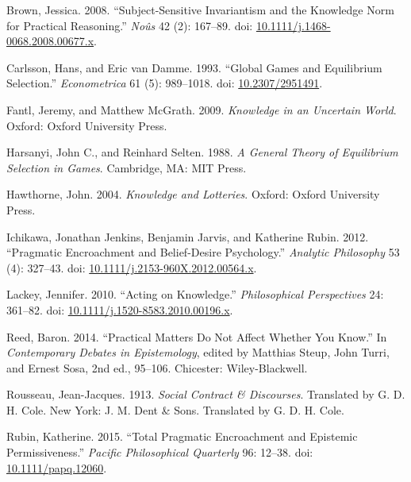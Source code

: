 \documentclass[
  11pt,
  letterpaper,
  DIV=11,
  numbers=noendperiod,
  twoside]{scrartcl}
\newlength{\cslhangindent}
\newenvironment{CSLReferences}[2] %
 {\begin{list}{}{%
  \setlength{\itemindent}{0pt}
  \setlength{\leftmargin}{0pt}
  \setlength{\parsep}{0pt}
  \ifodd #1
   \setlength{\leftmargin}{\cslhangindent}
   \setlength{\itemindent}{-1\cslhangindent}
  \fi
  \setlength{\itemsep}{#2\baselineskip}}}
 {\end{list}}
\begin{document}
\label{refs}
\begin{CSLReferences}{1}{0}
Brown, Jessica. 2008. {``Subject-Sensitive Invariantism and the
Knowledge Norm for Practical Reasoning.''} \emph{No{û}s} 42 (2):
167--89. doi:
\href{https://doi.org/10.1111/j.1468-0068.2008.00677.x}{10.1111/j.1468-0068.2008.00677.x}.

Carlsson, Hans, and Eric van Damme. 1993. {``Global Games and
Equilibrium Selection.''} \emph{Econometrica} 61 (5): 989--1018. doi:
\href{https://doi.org/10.2307/2951491}{10.2307/2951491}.

Fantl, Jeremy, and Matthew McGrath. 2009. \emph{Knowledge in an
Uncertain World}. Oxford: Oxford University Press.

Harsanyi, John C., and Reinhard Selten. 1988. \emph{A General Theory of
Equilibrium Selection in Games}. Cambridge, MA: {MIT} Press.

Hawthorne, John. 2004. \emph{Knowledge and Lotteries}. Oxford: Oxford
University Press.

Ichikawa, Jonathan Jenkins, Benjamin Jarvis, and Katherine Rubin. 2012.
{``Pragmatic Encroachment and Belief-Desire Psychology.''}
\emph{Analytic Philosophy} 53 (4): 327--43. doi:
\href{https://doi.org/10.1111/j.2153-960X.2012.00564.x}{10.1111/j.2153-960X.2012.00564.x}.

Lackey, Jennifer. 2010. {``Acting on Knowledge.''} \emph{Philosophical
Perspectives} 24: 361--82. doi:
\href{https://doi.org/10.1111/j.1520-8583.2010.00196.x}{10.1111/j.1520-8583.2010.00196.x}.

Reed, Baron. 2014. {``Practical Matters Do Not Affect Whether You
Know.''} In \emph{Contemporary Debates in Epistemology}, edited by
Matthias Steup, John Turri, and Ernest Sosa, 2nd ed., 95--106.
Chicester: Wiley-Blackwell.

Rousseau, Jean-Jacques. 1913. \emph{Social Contract \& Discourses}.
Translated by G. D. H. Cole. New York: J. M. Dent \& Sons. Translated by
G. D. H. Cole.

Rubin, Katherine. 2015. {``Total Pragmatic Encroachment and Epistemic
Permissiveness.''} \emph{Pacific Philosophical Quarterly} 96: 12--38.
doi: \href{https://doi.org/10.1111/papq.12060}{10.1111/papq.12060}.


\end{CSLReferences}
\end{document}
